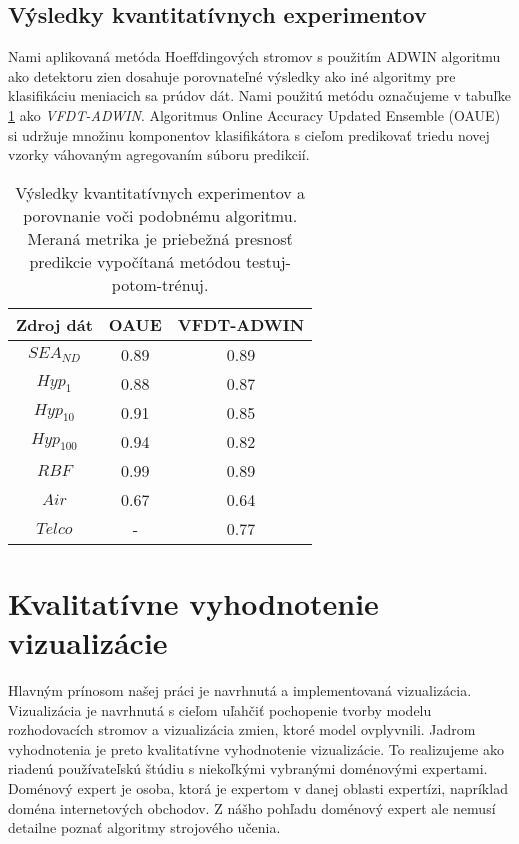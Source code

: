 \subsection{Výsledky kvantitatívnych experimentov}
Nami aplikovaná metóda Hoeffdingových stromov s použitím ADWIN algoritmu ako detektoru zien dosahuje porovnateľné výsledky ako iné algoritmy pre klasifikáciu meniacich sa prúdov dát. Nami použitú metódu označujeme v tabuľke \ref{tab-method-results} ako \textit{VFDT-ADWIN}. Algoritmus Online Accuracy Updated Ensemble (OAUE) \citep{brzezinski2014prequential} si udržuje množinu komponentov klasifikátora s cieľom predikovať triedu novej vzorky váhovaným agregovaním súboru predikcií.
\begin{table}[!htp]
\centering
\begin{tabular}{| c || c | c |}
\hline
\textbf{Zdroj dát} & \textbf{OAUE} & \textbf{VFDT-ADWIN} \\ \hline

$SEA_{ND}$ & 0.89 & 0.89 \\ \hline
$Hyp_1$ & 0.88 & 0.87 \\ \hline
$Hyp_{10}$ & 0.91 & 0.85 \\ \hline
$Hyp_{100}$ & 0.94 & 0.82 \\ \hline
$RBF$ & 0.99 & 0.89 \\ \hline
$Air$ & 0.67 & 0.64 \\ \hline
$Telco$ & - & 0.77 \\ \hline

\end{tabular}
\caption{Výsledky kvantitatívnych experimentov a porovnanie voči podobnému algoritmu. Meraná metrika je priebežná presnosť predikcie vypočítaná metódou testuj-potom-trénuj.}
\label{tab-method-results}
\end{table}



\section{Kvalitatívne vyhodnotenie vizualizácie}
Hlavným prínosom našej práci je navrhnutá a implementovaná vizualizácia. Vizualizácia je navrhnutá s cieľom uľahčiť pochopenie tvorby modelu rozhodovacích stromov a vizualizácia zmien, ktoré model ovplyvnili. Jadrom vyhodnotenia je preto kvalitatívne vyhodnotenie vizualizácie. To realizujeme ako riadenú používateľskú štúdiu s niekoľkými vybranými doménovými expertami. Doménový expert je osoba, ktorá je expertom v danej oblasti expertízi, napríklad doména internetových obchodov. Z nášho pohľadu doménový expert ale nemusí detailne poznať algoritmy strojového učenia.

